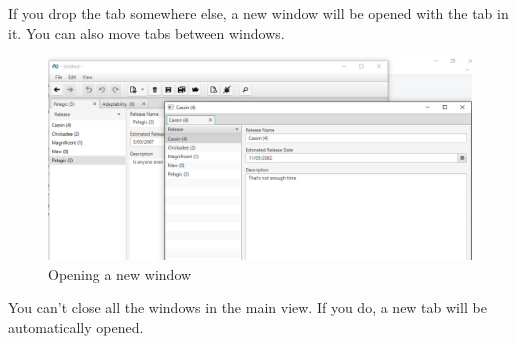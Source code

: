 If you drop the tab somewhere else, a new window will be opened with the tab in it. You can also move tabs between windows.

\begin{figure}[H]
\centering
\includegraphics[width=\textwidth]{images/screenshots/tabs3.png}
\caption{Opening a new window}
\label{fig:revert}
\end{figure}

You can't close all the windows in the main view. If you do, a new tab will be automatically opened.